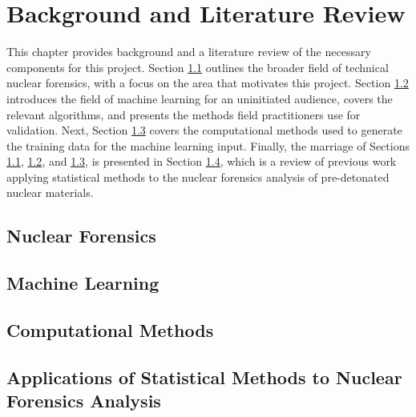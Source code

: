\chapter{Background and Literature Review}
\label{ch:litrev}

This chapter provides background and a literature review of the necessary
components for this project. Section \ref{sec:nfoverview} outlines the broader
field of technical nuclear forensics, with a focus on the area that motivates
this project.  Section \ref{sec:mlback} introduces the field of machine
learning for an uninitiated audience, covers the relevant algorithms, and
presents the methods field practitioners use for validation. Next, Section
\ref{sec:fcsim} covers the computational methods used to generate the training
data for the machine learning input. Finally, the marriage of Sections
\ref{sec:nfoverview}, \ref{sec:mlback}, and \ref{sec:fcsim}, is presented in
Section \ref{sec:stats4nf}, which is a review of previous work applying
statistical methods to the nuclear forensics analysis of pre-detonated nuclear
materials. 

\section{Nuclear Forensics}
\label{sec:nfoverview}


\section{Machine Learning}
\label{sec:mlback}


\section{Computational Methods}
\label{sec:fcsim}


\section{Applications of Statistical Methods to Nuclear Forensics Analysis}
\label{sec:stats4nf}


